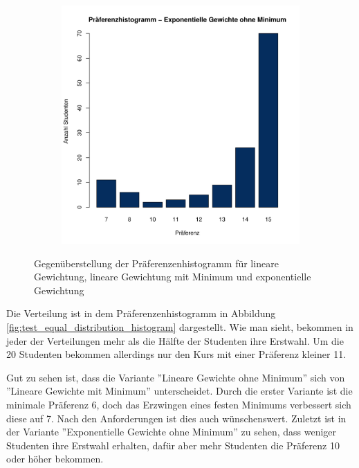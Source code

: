 \begin{figure}
\begin{subfigure}{0.30\textwidth}
				\end{subfigure}
			\begin{subfigure}{0.3\textwidth}
				\includegraphics[width=1.0\textwidth]{./testing/images/NormalDistPreferencesHistExpo.jpg}
			\end{subfigure}
				\caption{Gegenüberstellung der Präferenzenhistogramm für lineare Gewichtung, lineare Gewichtung mit Minimum und exponentielle Gewichtung}
				\label{fig:test_norm_distribution_histogram}
			\end{figure}
		
					Die Verteilung ist in dem Präferenzenhistogramm in Abbildung \ref{fig:test_equal_distribution_histogram} dargestellt.
			Wie man sieht, bekommen in jeder der Verteilungen mehr als die Hälfte der Studenten ihre Erstwahl.
			Um die 20 Studenten bekommen allerdings nur den Kurs mit einer Präferenz kleiner 11.\newline
			
			Gut zu sehen ist, dass die Variante ''Lineare Gewichte ohne Minimum'' sich von ''Lineare Gewichte mit Minimum'' unterscheidet.
			Durch die erster Variante ist die minimale Präferenz 6, doch das Erzwingen eines festen Minimums verbessert sich diese auf 7.
			Nach den Anforderungen ist dies auch wünschenswert.
			Zuletzt ist in der Variante ''Exponentielle Gewichte ohne Minimum'' zu sehen, dass weniger Studenten ihre Erstwahl erhalten, dafür aber mehr Studenten die Präferenz 10 oder höher bekommen.\newline
			

